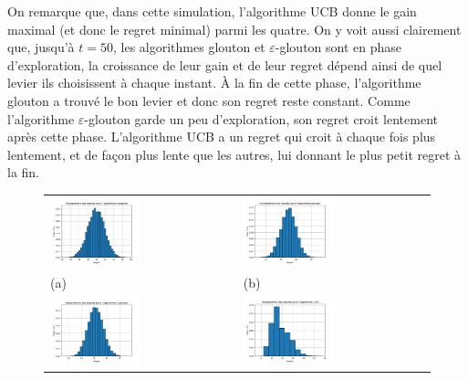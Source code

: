 \documentclass[a4paper,11pt]{article}
\begin{document}
On remarque que, dans cette simulation, l'algorithme UCB donne le gain maximal (et donc le regret minimal) parmi les quatre. On y voit aussi clairement que, jusqu'à $t = 50$, les algorithmes glouton et $\varepsilon$-glouton sont en phase d'exploration, la croissance de leur gain et de leur regret dépend ainsi de quel levier ils choisissent à chaque instant. À la fin de cette phase, l'algorithme glouton a trouvé le bon levier et donc son regret reste constant. Comme l'algorithme $\varepsilon$-glouton garde un peu d'exploration, son regret croit lentement après cette phase. L'algorithme UCB a un regret qui croit à chaque fois plus lentement, et de façon plus lente que les autres, lui donnant le plus petit regret à la fin.

\begin{figure}[ht]
\centering
\begin{tabular}{@{} >{\centering} m{} @{} >{\centering} m{} @{}}
\includegraphics[width=0.5\textwidth]{Hist_alea} & \includegraphics[width=0.5\textwidth]{Hist_glouton} \tabularnewline
(a) & (b) \tabularnewline
\includegraphics[width=0.5\textwidth]{Hist_glouton_e} & \includegraphics[width=0.5\textwidth]{Hist_UCB} \tabularnewline

\end{tabular}
\end{figure}
\end{document}
